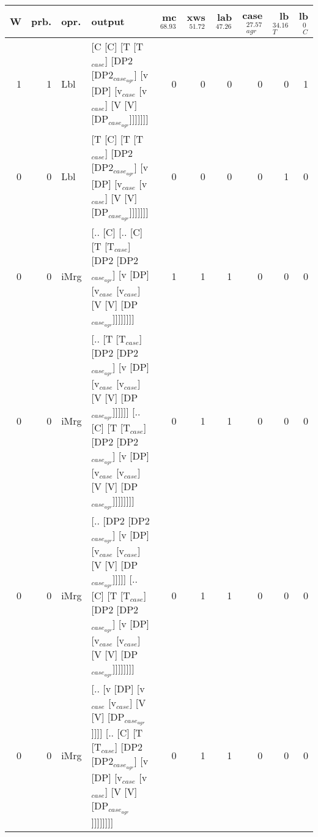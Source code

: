 \begin{tabularx}{\linewidth}{rrlXrrrrrr}
\hline
   W &   prb. & opr.   & output                                                                                                                                                                              &   mc$^{68.93}$ &   xws$^{51.72}$ &   lab$^{47.26}$ &   case$_{agr}^{27.57}$ &   lb$_{T}^{34.16}$ &   lb$_{C}^{0}$ \\
\hline
   1 &   1 & Lbl  & [C [C] [T [T$_{case}$] [DP2 [DP2$_{case_{agr}}$] [v [DP] [v$_{case}$ [v$_{case}$] [V [V] [DP$_{case_{agr}}$]]]]]]]                                                                                          &            0 &             0 &             0 &                  0 &              0 &             1 \\
   0 &   0 & Lbl  & [T [C] [T [T$_{case}$] [DP2 [DP2$_{case_{agr}}$] [v [DP] [v$_{case}$ [v$_{case}$] [V [V] [DP$_{case_{agr}}$]]]]]]]                                                                                          &            0 &             0 &             0 &                  0 &              1 &             0 \\
   0 &   0 & iMrg & [.. [C] [.. [C] [T [T$_{case}$] [DP2 [DP2$_{case_{agr}}$] [v [DP] [v$_{case}$ [v$_{case}$] [V [V] [DP$_{case_{agr}}$]]]]]]]]                                                                                &            1 &             1 &             1 &                  0 &              0 &             0 \\
   0 &   0 & iMrg & [.. [T [T$_{case}$] [DP2 [DP2$_{case_{agr}}$] [v [DP] [v$_{case}$ [v$_{case}$] [V [V] [DP$_{case_{agr}}$]]]]]] [.. [C] [T [T$_{case}$] [DP2 [DP2$_{case_{agr}}$] [v [DP] [v$_{case}$ [v$_{case}$] [V [V] [DP$_{case_{agr}}$]]]]]]]] &            0 &             1 &             1 &                  0 &              0 &             0 \\
   0 &   0 & iMrg & [.. [DP2 [DP2$_{case_{agr}}$] [v [DP] [v$_{case}$ [v$_{case}$] [V [V] [DP$_{case_{agr}}$]]]]] [.. [C] [T [T$_{case}$] [DP2 [DP2$_{case_{agr}}$] [v [DP] [v$_{case}$ [v$_{case}$] [V [V] [DP$_{case_{agr}}$]]]]]]]]              &            0 &             1 &             1 &                  0 &              0 &             0 \\
   0 &   0 & iMrg & [.. [v [DP] [v$_{case}$ [v$_{case}$] [V [V] [DP$_{case_{agr}}$]]]] [.. [C] [T [T$_{case}$] [DP2 [DP2$_{case_{agr}}$] [v [DP] [v$_{case}$ [v$_{case}$] [V [V] [DP$_{case_{agr}}$]]]]]]]]                                   &            0 &             1 &             1 &                  0 &              0 &             0 \\

\end{tabularx}
